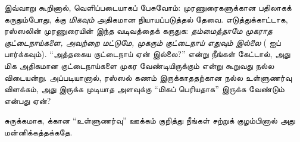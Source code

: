 \documentclass[../../../include/open-logic-section]{subfiles}
\begin{document}
இவ்வாறு கூறினால், வெளிப்படையாகப் பேசுவோம்: முரணுரைகளுக்கான பதிலாகக்
கருதும்போது, \limofsize{} க்கு \emph{மிகவும்} அதிகமான நியாயப்படுத்தல்
தேவை. எடுத்துக்காட்டாக, ரஸ்ஸலின் முரணுரையின் இந்த வடிவத்தைக் கருதுக:
\emph{தம்மைத்தாமே முகராத குட்டைநாய்களை, அவற்றை மட்டுமே, முகரும் குட்டைநாய்
எதுவும் இல்லை} ( ஐப் பார்க்கவும்). ``அத்தகைய
குட்டைநாய் ஏன் இல்லை?'' என்று நீங்கள் கேட்டால், அது மிக அதிகமான
குட்டைநாய்களை முகர வேண்டியிருக்கும் என்று கூறுவது நல்ல விடையன்று. அப்படியானால்,
ரஸ்ஸல் கணம் இருக்காததற்கான நல்ல உள்ளுணர்வு விளக்கம், அது இருக்க முடியாத
அளவுக்கு ``மிகப் பெரியதாக'' இருக்க வேண்டும் என்பது ஏன்?

சுருக்கமாக, \limofsize{} க்கான ``உள்ளுணர்வு'' ஊக்கம் குறித்து நீங்கள்
சற்றுக் குழம்பினால் அது மன்னிக்கத்தக்கதே.
\end{document}
